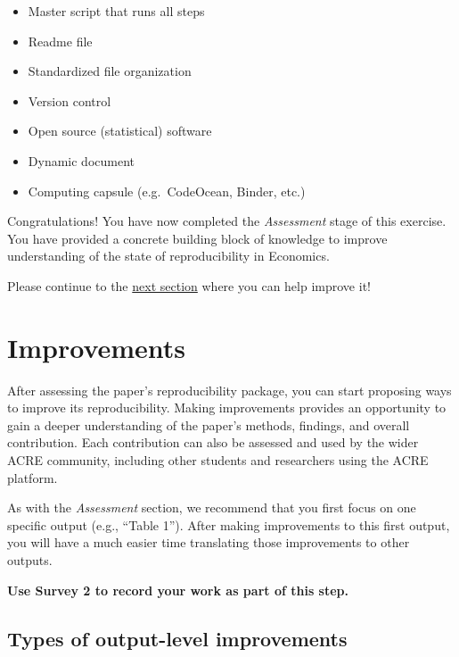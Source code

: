 \documentclass[]{book}
\providecommand{\tightlist}{%
  \setlength{\itemsep}{0pt}\setlength{\parskip}{0pt}}
\begin{document}
\begin{itemize}
\tightlist
\item
  Master script that runs all steps
\item
  Readme file
\item
  Standardized file organization\\
\item
  Version control
\item
  Open source (statistical) software\\
\item
  Dynamic document\\
\item
  Computing capsule (e.g.~CodeOcean, Binder, etc.)
\end{itemize}

Congratulations! You have now completed the \emph{Assessment} stage of this exercise. You have provided a concrete building block of knowledge to improve understanding of the state of reproducibility in Economics.

Please continue to the \protect\hyperlink{improvements}{next section} where you can help improve it!

\hypertarget{improvements}{%
\chapter{Improvements}\label{improvements}}

After assessing the paper's reproducibility package, you can start proposing ways to improve its reproducibility. Making improvements provides an opportunity to gain a deeper understanding of the paper's methods, findings, and overall contribution. Each contribution can also be assessed and used by the wider ACRE community, including other students and researchers using the ACRE platform.

As with the \emph{Assessment} section, we recommend that you first focus on one specific output (e.g., ``Table 1''). After making improvements to this first output, you will have a much easier time translating those improvements to other outputs.

\textbf{Use Survey 2 to record your work as part of this step.}

\hypertarget{types-of-output-level-improvements}{%
\section{Types of output-level improvements}\label{types-of-output-level-improvements}}
\end{document}
